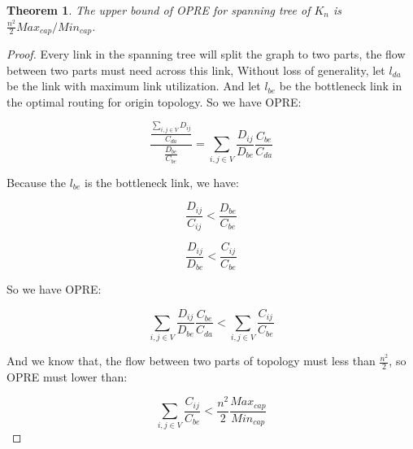 \documentclass[conference]{IEEEtran}
\newtheorem{theorem}{Theorem}
\begin{document}
\begin{theorem}
The upper bound of OPRE for spanning tree of $K_n$ is $\frac{n^2}{2} Max_{cap}/Min_{cap}$.
\end{theorem}

\begin{proof}
Every link in the spanning tree will split the graph to two parts, the flow between two parts must need across this link,
Without loss of generality, let $l_{da}$ be the link with maximum link utilization. And let $l_{be}$ be the bottleneck link 
in the optimal routing for origin topology. So we have OPRE:

\begin{equation}
    \frac{\frac{\sum_{i,j \in V} D_{ij}}{C_{da}}}{\frac{D_{be}}{C_{be}}} = \sum_{i,j \in V} \frac{D_{ij}}{D_{be}} \frac{C_{be}}{C_{da}} 
\end{equation}

Because the $l_{be}$ is the bottleneck link, we have:

\begin{equation}
    \frac{D_{ij}}{C_{ij}} < \frac{D_{be}}{C_{be}}
\end{equation}

\begin{equation}
    \frac{D_{ij}}{D_{be}} < \frac{C_{ij}}{C_{be}}
\end{equation}

So we have OPRE:

\begin{equation}
    \sum_{i,j \in V} \frac{D_{ij}}{D_{be}} \frac{C_{be}}{C_{da}} < \sum_{i,j \in V} \frac{C_{ij}}{C_{be}}
\end{equation}

And we know that, the flow between two parts of topology must less than $\frac{n^2}{2}$, so OPRE must lower than:

\begin{equation}
    \sum_{i,j \in V} \frac{C_{ij}}{C_{be}} < \frac{n^2}{2} \frac{Max_{cap}}{Min_{cap}}
\end{equation}

\end{proof}
\end{document}
